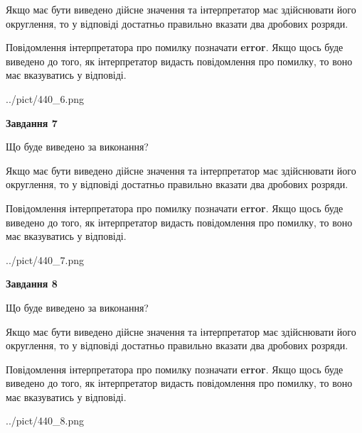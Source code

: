 \documentclass[12pt, ukrainian]{article}
\begin{document}
{\begin {Large}
Якщо має бути виведено дійсне значення та інтерпретатор має здійснювати його округлення, 
то у відповіді достатньо правильно вказати два дробових розряди.

Повідомлення інтерпретатора про помилку позначати \textbf{error}.
Якщо щось буде виведено до того, як інтерпретатор видасть повідомлення про помилку, 
то воно має вказуватись у відповіді. \par

\begin{center}
	{../pict/440_6.png}
\end{center}
\newpage

{\begin {center}\textbf{Завдання 7}\end {center}}\par
Що буде виведено за виконання? \par

Якщо має бути виведено дійсне значення та інтерпретатор має здійснювати його округлення, 
то у відповіді достатньо правильно вказати два дробових розряди.

Повідомлення інтерпретатора про помилку позначати \textbf{error}.
Якщо щось буде виведено до того, як інтерпретатор видасть повідомлення про помилку, 
то воно має вказуватись у відповіді. \par

\begin{center}
	{../pict/440_7.png}
\end{center}
\newpage

{\begin {center}\textbf{Завдання 8}\end {center}}\par
Що буде виведено за виконання? \par

Якщо має бути виведено дійсне значення та інтерпретатор має здійснювати його округлення, 
то у відповіді достатньо правильно вказати два дробових розряди.

Повідомлення інтерпретатора про помилку позначати \textbf{error}.
Якщо щось буде виведено до того, як інтерпретатор видасть повідомлення про помилку, 
то воно має вказуватись у відповіді. \par

\begin{center}
	{../pict/440_8.png}
\end{center}
\newpage


\end{Large}}
\end{document}
